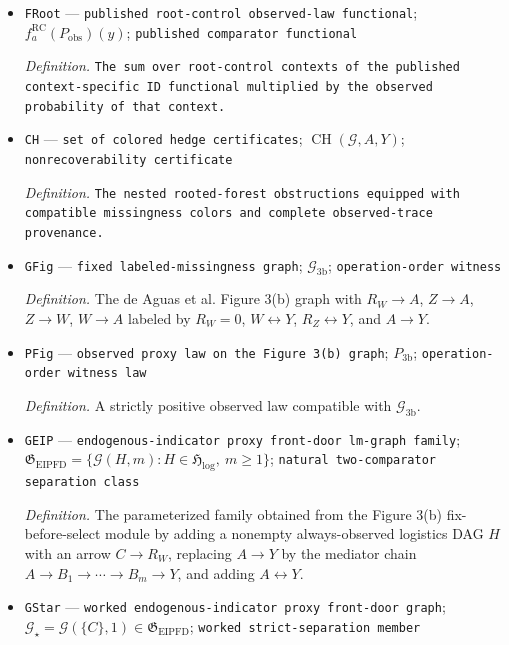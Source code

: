 \documentclass{article}
\begin{document}
\begin{itemize}
  \item \texttt{FRoot} --- \texttt{published root-\allowbreak{}control observed-\allowbreak{}law functional}; \(f^{\mathrm{RC}}_a(P_{\mathrm{obs}})(y)\); \texttt{published comparator functional}
  \par\smallskip\noindent\emph{Definition.} \texttt{The sum over root-\allowbreak{}control contexts of the published context-\allowbreak{}specific ID functional multiplied by the observed probability of that context.}
  \item \texttt{CH} --- \texttt{set of colored hedge certificates}; \(\operatorname{CH}(\mathcal G,A,Y)\); \texttt{nonrecoverability certificate}
  \par\smallskip\noindent\emph{Definition.} \texttt{The nested rooted-\allowbreak{}forest obstructions equipped with compatible missingness colors and complete observed-\allowbreak{}trace provenance.}
  \item \texttt{GFig} --- \texttt{fixed labeled-\allowbreak{}missingness graph}; \(\mathcal G_{\mathrm{3b}}\); \texttt{operation-\allowbreak{}order witness}
  \par\smallskip\noindent\emph{Definition.} The de Aguas et al. Figure 3(b) graph with \(R_W\to A\), \(Z\to A\), \(Z\to W\), \(W\to A\) labeled by \(R_W=0\), \(W\leftrightarrow Y\), \(R_Z\leftrightarrow Y\), and \(A\to Y\).
  \item \texttt{PFig} --- \texttt{observed proxy law on the Figure 3(b) graph}; \(P_{\mathrm{3b}}\); \texttt{operation-\allowbreak{}order witness law}
  \par\smallskip\noindent\emph{Definition.} A strictly positive observed law compatible with \(\mathcal G_{\mathrm{3b}}\).
  \item \texttt{GEIP} --- \texttt{endogenous-\allowbreak{}indicator proxy front-\allowbreak{}door lm-\allowbreak{}graph family}; \(\mathfrak G_{\mathrm{EIPFD}}=\{\mathcal G(H,m):H\in\mathfrak H_{\mathrm{log}},\ m\geq1\}\); \texttt{natural two-\allowbreak{}comparator separation class}
  \par\smallskip\noindent\emph{Definition.} The parameterized family obtained from the Figure 3(b) fix-before-select module by adding a nonempty always-observed logistics DAG \(H\) with an arrow \(C\to R_W\), replacing \(A\to Y\) by the mediator chain \(A\to B_1\to\cdots\to B_m\to Y\), and adding \(A\leftrightarrow Y\).
  \item \texttt{GStar} --- \texttt{worked endogenous-\allowbreak{}indicator proxy front-\allowbreak{}door graph}; \(\mathcal G_\star=\mathcal G(\{C\},1)\in\mathfrak G_{\mathrm{EIPFD}}\); \texttt{worked strict-\allowbreak{}separation member}

\end{itemize}
\end{document}
